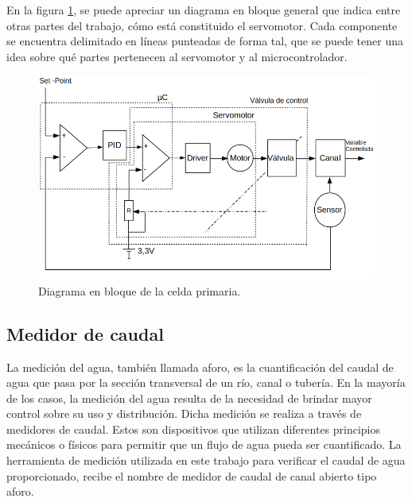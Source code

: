 En la figura \ref{fig:Diagrama en bloque de la celda primaria}, se puede apreciar un diagrama en bloque general que indica entre otras partes del trabajo, cómo está constituido el servomotor. Cada componente se encuentra delimitado en líneas punteadas de forma tal, que se puede tener una idea sobre qué partes pertenecen al servomotor y al microcontrolador.   
   

\begin{figure}[htpb]
\centering
\includegraphics[scale=.65]{./Figures/DiagramaEnBloqueConServoMotor-V2.png}
\caption{Diagrama en bloque de la celda primaria.}
\label{fig:Diagrama en bloque de la celda primaria}
\end{figure}


\subsection{Medidor de caudal}
\label{subsec:Medidor de caudal}
La medición del agua, también llamada aforo, es la cuantificación del caudal de agua que pasa por la sección transversal de un río, canal o tubería. 
En la mayoría de los casos, la medición del agua resulta de la necesidad de brindar mayor control sobre su uso y distribución. Dicha medición se realiza a través de medidores de caudal. Estos son dispositivos que utilizan diferentes principios mecánicos o físicos para permitir que un flujo de agua pueda ser cuantificado. 
La herramienta de medición utilizada en este trabajo para verificar el caudal de agua proporcionado, recibe el nombre de medidor de caudal de canal abierto tipo aforo.

